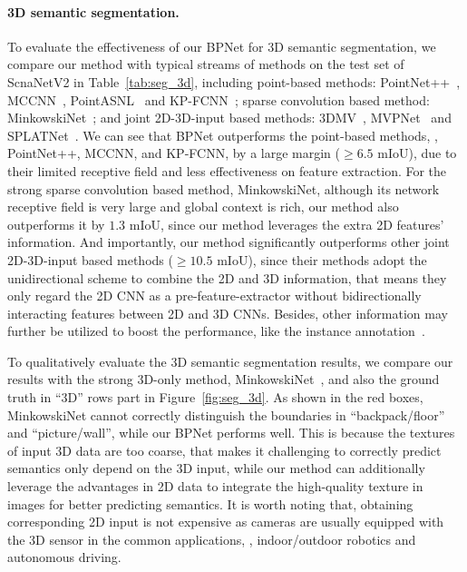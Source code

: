 \documentclass[final]{cvpr}
\begin{document}
\paragraph{3D semantic segmentation.}
To evaluate the effectiveness of our BPNet for 3D semantic segmentation, we compare our method with typical streams of methods on the test set of ScnaNetV2 in Table~\ref{tab:seg_3d}, including point-based methods: PointNet++~\cite{qi2017pointnet++}, MCCNN~\cite{hermosilla2018monte}, PointASNL~\cite{yan2020pointasnl} and KP-FCNN~\cite{thomas2019kpconv}; sparse convolution based method: MinkowskiNet~\cite{choy20194d}; and joint 2D-3D-input based methods: 3DMV~\cite{dai20183dmv}, MVPNet~\cite{jaritz2019multi} and SPLATNet~\cite{su2018splatnet}.
We can see that BPNet outperforms the point-based methods, \eg, PointNet++, MCCNN, and KP-FCNN, by a large margin ($\geq 6.5$ mIoU), due to their limited receptive field and less effectiveness on feature extraction.
For the strong sparse convolution based method, MinkowskiNet, although its network receptive field is very large and global context is rich, our method also outperforms it by $1.3$ mIoU, since our method leverages the extra 2D features' information.
And importantly, our method significantly outperforms other joint 2D-3D-input based methods ($\geq 10.5$ mIoU), since their methods adopt the unidirectional scheme to combine the 2D and 3D information, that means they only regard the 2D CNN as a pre-feature-extractor without bidirectionally interacting features between 2D and 3D CNNs.
Besides, other information may further be utilized to boost the performance, like the instance annotation~\cite{han2020occuseg}.


To qualitatively evaluate the 3D semantic segmentation results, we compare our results with the strong 3D-only method, MinkowskiNet~\cite{choy20194d}, and also the ground truth in ``3D'' rows part in Figure~\ref{fig:seg_3d}.
As shown in the red boxes, MinkowskiNet cannot correctly distinguish the boundaries in ``backpack/floor'' and ``picture/wall'', while our BPNet performs well.
This is because the textures of input 3D data are too coarse, that makes it challenging to correctly predict semantics only depend on the 3D input, while our method can additionally leverage the advantages in 2D data to integrate the high-quality texture in images for better predicting semantics.
It is worth noting that, obtaining corresponding 2D input is not expensive as cameras are usually equipped with the 3D sensor in the common applications, \eg, indoor/outdoor robotics and autonomous driving.
\end{document}
